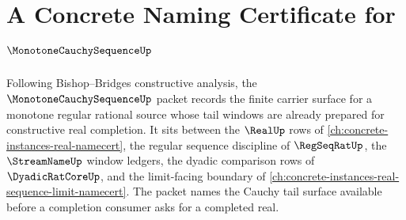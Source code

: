 \chapter{A Concrete Naming Certificate for $\MonotoneCauchySequenceUp$}
\label{ch:concrete-instances-monotone-cauchy-sequence-namecert}

Following Bishop--Bridges constructive analysis, the $\MonotoneCauchySequenceUp$ packet records the finite carrier surface for a monotone regular rational source whose tail windows are already prepared for constructive real completion. It sits between the $\RealUp$ rows of \autoref{ch:concrete-instances-real-namecert}, the regular sequence discipline of $\RegSeqRatUp$, the $\StreamNameUp$ window ledgers, the dyadic comparison rows of $\DyadicRatCoreUp$, and the limit-facing boundary of \autoref{ch:concrete-instances-real-sequence-limit-namecert}. The packet names the Cauchy tail surface available before a completion consumer asks for a completed real.

